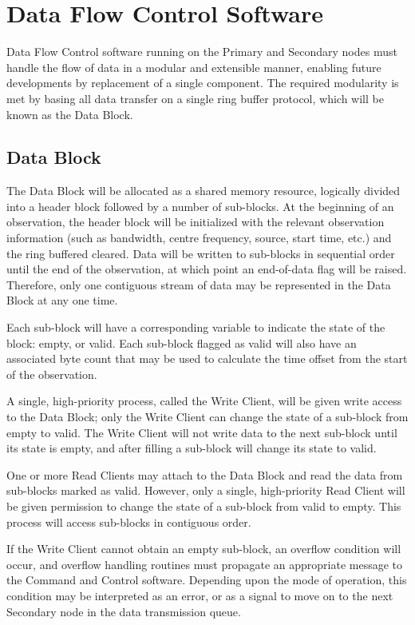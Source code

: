 \chapter{Data Flow Control Software}

Data Flow Control software running on the Primary and Secondary nodes
must handle the flow of data in a modular and extensible manner,
enabling future developments by replacement of a single component.
The required modularity is met by basing all data transfer on a single
ring buffer protocol, which will be known as the Data Block.

\section{Data Block}
\label{sec:data_block}

The Data Block will be allocated as a shared memory resource,
logically divided into a header block followed by a number of
sub-blocks.  At the beginning of an observation, the header block will
be initialized with the relevant observation information (such as
bandwidth, centre frequency, source, start time, etc.) and the ring
buffered cleared.  Data will be written to sub-blocks in sequential
order until the end of the observation, at which point an end-of-data
flag will be raised.  Therefore, only one contiguous stream of data
may be represented in the Data Block at any one time.

Each sub-block will have a corresponding variable to indicate the
state of the block: empty, or valid.  Each sub-block flagged as valid
will also have an associated byte count that may be used to calculate
the time offset from the start of the observation.

A single, high-priority process, called the Write Client, will be
given write access to the Data Block; only the Write Client can change
the state of a sub-block from empty to valid.  The Write Client will
not write data to the next sub-block until its state is empty, and
after filling a sub-block will change its state to valid.

One or more Read Clients may attach to the Data Block and read the
data from sub-blocks marked as valid.  However, only a single,
high-priority Read Client will be given permission to change the state
of a sub-block from valid to empty.  This process will access
sub-blocks in contiguous order.

If the Write Client cannot obtain an empty sub-block, an overflow
condition will occur, and overflow handling routines must propagate an
appropriate message to the Command and Control software.  Depending
upon the mode of operation, this condition may be interpreted as an
error, or as a signal to move on to the next Secondary node in the
data transmission queue.


